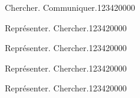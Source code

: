 \begin{pageParcoursd}
 

\begin{ExoCd}{Chercher. Communiquer.}{1234}{2}{0}{0}{0}{0}
 
\end{ExoCd}


 
 
\begin{ExoCd}{Représenter. Chercher.}{1234}{2}{0}{0}{0}{0}
 
\end{ExoCd}

\begin{ExoCd}{Représenter. Chercher.}{1234}{2}{0}{0}{0}{0}
 
\end{ExoCd}

\begin{ExoCd}{Représenter. Chercher.}{1234}{2}{0}{0}{0}{0}
 
\end{ExoCd}

\begin{ExoCd}{Représenter. Chercher.}{1234}{2}{0}{0}{0}{0}
 
\end{ExoCd}


\end{pageParcoursd}


